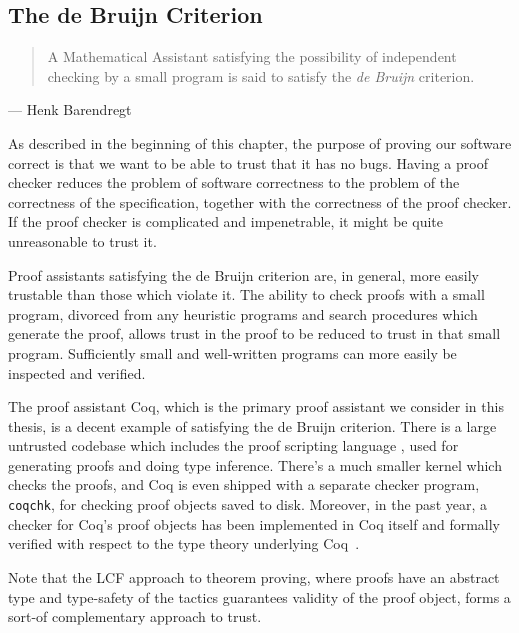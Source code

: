 \subsection{The de Bruijn Criterion}\label{sec:debruijn-criterion}
\begin{quote}
  A Mathematical Assistant satisfying the possibility of independent checking by a small program is said to satisfy the \emph{de Bruijn} criterion.
\end{quote}
\begin{flushright}
  --- Henk Barendregt~\cite{challenge2005Barendregt}
\end{flushright}

As described in the beginning of this chapter, the purpose of proving our software correct is that we want to be able to trust that it has no bugs.
Having a proof checker reduces the problem of software correctness to the problem of the correctness of the specification, together with the correctness of the proof checker.
If the proof checker is complicated and impenetrable, it might be quite unreasonable to trust it.

Proof assistants satisfying the de Bruijn criterion are, in general, more easily trustable than those which violate it.
The ability to check proofs with a small program, divorced from any heuristic programs and search procedures which generate the proof, allows trust in the proof to be reduced to trust in that small program.
Sufficiently small and well-written programs can more easily be inspected and verified.


The proof assistant Coq, which is the primary proof assistant we consider in this thesis, is a decent example of satisfying the de Bruijn criterion.
There is a large untrusted codebase which includes the proof scripting language \Ltac, used for generating proofs and doing type inference.
There's a much smaller kernel which checks the proofs, and Coq is even shipped with a separate checker program, \texttt{coqchk}, for checking proof objects saved to disk.
Moreover, in the past year, a checker for Coq's proof objects has been implemented in Coq itself and formally verified with respect to the type theory underlying Coq~\cite{Coq2019Sozeau}.

Note that the LCF approach to theorem proving, where proofs have an abstract type and type-safety of the tactics guarantees validity of the proof object, forms a sort-of complementary approach to trust.

